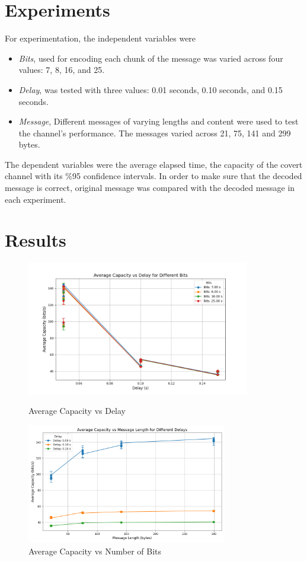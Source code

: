 \documentclass[10pt,a4paper]{article}
\begin{document}
\section*{Experiments}
For experimentation, the independent variables were 
\begin{itemize}
    \item \textit{Bits}, used for encoding each chunk of the message was varied across four values: 7, 8, 16, and 25.
    \item \textit{Delay}, was tested with three values: 0.01 seconds, 0.10 seconds, and 0.15 seconds.
    \item \textit{Message}, Different messages of varying lengths and content were used to test the channel's performance. The messages varied across 21, 75, 141 and 299 bytes.

\end{itemize}

The dependent variables were the average elapsed time, the capacity of the covert channel with its \%95 confidence intervals.
In order to make sure that the decoded message is correct, original message was compared with the decoded message in each experiment. 


\section*{Results}

\begin{figure}[H]
\centering
\includegraphics[width=0.87\textwidth]{ave_cap_vs_delay.png}
\caption{Average Capacity vs Delay}

\includegraphics[width=0.78\textwidth]{ave_cap_vs_len.png}
\caption{Average Capacity vs Number of Bits}
\end{figure}
\end{document}
